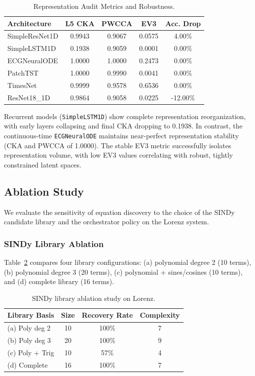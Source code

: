 \documentclass[twocolumn]{article}
\begin{document}
\begin{table}[htbp]
\centering
\caption{Representation Audit Metrics and Robustness.}
\label{tab:audit}
\begin{tabular}{lcccc}
\toprule
Architecture & L5 CKA & PWCCA & EV3 & Acc. Drop \\
\midrule
SimpleResNet1D & 0.9943 & 0.9067 & 0.0575 & 4.00\% \\
SimpleLSTM1D   & 0.1938 & 0.9059 & 0.0001 & 0.00\% \\
ECGNeuralODE   & 1.0000 & 1.0000 & 0.2473 & 0.00\% \\
PatchTST       & 1.0000 & 0.9990 & 0.0041 & 0.00\% \\
TimesNet       & 0.9999 & 0.9578 & 0.6536 & 0.00\% \\
ResNet18\_1D   & 0.9864 & 0.9058 & 0.0225 & -12.00\% \\
\bottomrule
\end{tabular}
\end{table}

Recurrent models (\texttt{SimpleLSTM1D}) show complete representation reorganization, with early layers collapsing and final CKA dropping to 0.1938. In contrast, the continuous-time \texttt{ECGNeuralODE} maintains near-perfect representation stability (CKA and PWCCA of 1.0000). The stable EV3 metric successfully isolates representation volume, with low EV3 values correlating with robust, tightly constrained latent spaces.

\subsection{Ablation Study}
We evaluate the sensitivity of equation discovery to the choice of the SINDy candidate library and the orchestrator policy on the Lorenz system.

\subsubsection{SINDy Library Ablation}
Table~\ref{tab:lib_ablation} compares four library configurations: (a) polynomial degree 2 (10 terms), (b) polynomial degree 3 (20 terms), (c) polynomial + sines/cosines (10 terms), and (d) complete library (16 terms).

\begin{table}[htbp]
\centering
\caption{SINDy library ablation study on Lorenz.}
\label{tab:lib_ablation}
\begin{tabular}{lccc}
\toprule
Library Basis & Size & Recovery Rate & Complexity \\
\midrule
(a) Poly deg 2  & 10 & 100\% & 7 \\
(b) Poly deg 3  & 20 & 100\% & 9 \\
(c) Poly + Trig & 10 & 57\%  & 4 \\
(d) Complete    & 16 & 100\% & 7 \\
\bottomrule
\end{tabular}
\end{table}
\end{document}
